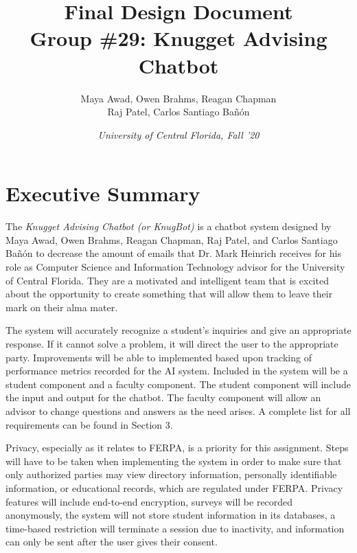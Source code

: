 \documentclass[titlepage, 12pt]{article}
\title{\textbf{Final Design Document} \\
    \large Group \#29: Knugget Advising Chatbot}
\author{Maya Awad, Owen Brahms, Reagan Chapman \\
    Raj Patel, Carlos Santiago Bañón}
\date{\textit{University of Central Florida, Fall '20}}
\begin{document}
\maketitle


\tableofcontents
\pagebreak




\section{Executive Summary}

The \emph{Knugget Advising Chatbot (or KnugBot)} is a chatbot system designed by Maya Awad, Owen Brahms, Reagan Chapman, Raj Patel, and Carlos Santiago Bañón to decrease the amount of emails that Dr. Mark Heinrich receives for his role as Computer Science and Information Technology advisor for the University of Central Florida. They are a motivated and intelligent team that is excited about the opportunity to create something that will allow them to leave their mark on their alma mater.

The system will accurately recognize a student’s inquiries and give an appropriate response. If it cannot solve a problem, it will direct the user to the appropriate party. Improvements will be able to implemented based upon tracking of performance metrics recorded for the AI system. Included in the system will be a student component and a faculty component. The student component will include the input and output for the chatbot. The faculty component will allow an advisor to change questions and answers as the need arises. A complete list for all requirements can be found in Section 3.

Privacy, especially as it relates to FERPA, is a priority for this assignment. Steps will have to be taken when implementing the system in order to make sure that only authorized parties may view directory information, personally identifiable information, or educational records, which are regulated under FERPA. Privacy features will include end-to-end encryption, surveys will be recorded anonymously, the system will not store student information in its databases, a time-based restriction will terminate a session due to inactivity, and information can only be sent after the user gives their consent.
\end{document}
